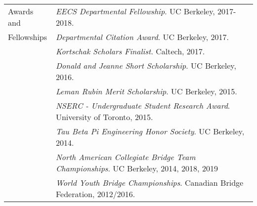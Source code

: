 \documentclass[letterpaper,10pt,oneside]{article}
\begin{document}
     \noindent \begin{tabular}{@{} l l}
 \Large{Awards and }    & \textit{EECS Departmental Fellowship}. UC Berkeley, 2017-2018. \\
  \Large{Fellowships}   & \textit{Departmental Citation Award}. UC Berkeley, 2017. \\
     & \textit{Kortschak Scholars Finalist}. Caltech, 2017.\\
     & \textit{Donald and Jeanne Short Scholarship}. UC Berkeley, 2016. \\
     & \textit{Leman Rubin Merit Scholarship}. UC Berkeley, 2015.\\
     & \textit{NSERC - Undergraduate Student Research Award}. University of Toronto, 2015.\\
     & \textit{Tau Beta Pi Engineering Honor Society}. UC Berkeley, 2014.\\
      & \textit{North American Collegiate Bridge Team Championships}. UC Berkeley, 2014, 2018, 2019\\
     & \textit{World Youth Bridge Championships}. Canadian Bridge Federation, 2012/2016. \\
\end{tabular}

\newpage

\begin{comment}
\noindent \begin{tabular}{@{} l l l}
 \Large{References} & \href{http://www.professorone.com}{Professor One} & \href{http://www.professortwo.com}{Professor Two} \\
 & Department Name &  Department Name  \\
 & University Name &  University Name \\
 & \small{\href{mailto:prof1@email.com}{prof1@email.com},+1\,(123)\,456-7899} & \small{\href{mailto:prof2@email.com}{prof2@email.com},+1\,(987)\,654-3210} \\
&& \\
 & \href{http://www.professorthree.com}{Professor Three} & \href{http://www.professorfour.com}{Professor Four}  \\
 & Department Name &  Department Name \\
 & University Name &  University Name \\
 & \small{\href{mailto:prof3@email.com}{prof3@email.com},+1\,(123)\,789-1011} & \small{\href{mailto:prof4@email.com}{prof4@email.com},+1\,(789)\,456-9879} \\
\end{tabular}
\end{comment}
\end{document}
